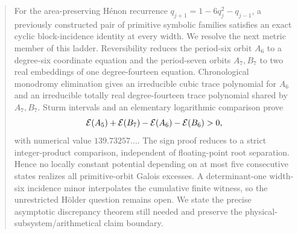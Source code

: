 \begin{abstract}
For the area-preserving H\'enon recurrence
\(q_{j+1}=1-6q_j^2-q_{j-1}\), a previously constructed pair of primitive
symbolic families satisfies an exact cyclic block-incidence identity at every
width.  We resolve the next metric member of this ladder.  Reversibility
reduces the period-six orbit \(A_6\) to a degree-six coordinate equation and
the period-seven orbits \(A_7,B_7\) to two real embeddings of one
degree-fourteen equation.  Chronological monodromy elimination gives an
irreducible cubic trace polynomial for \(A_6\) and an irreducible totally real
degree-fourteen trace polynomial shared by \(A_7,B_7\).  Sturm intervals and
an elementary logarithmic comparison prove
\[
 \Egal(A_5)+\Egal(B_7)-\Egal(A_6)-\Egal(B_6)>0,
\]
with numerical value \(139.73257\ldots\).  The sign proof reduces to a
strict integer-product comparison, independent of floating-point root
separation.  Hence no locally constant potential depending on at most five
consecutive states realizes all primitive-orbit Galois excesses.  A
determinant-one width-six incidence minor interpolates the cumulative finite
witness, so the unrestricted H\"older question remains open.  We state the
precise asymptotic discrepancy theorem still needed and preserve the
physical-subsystem/arithmetical claim boundary.
\end{abstract}
